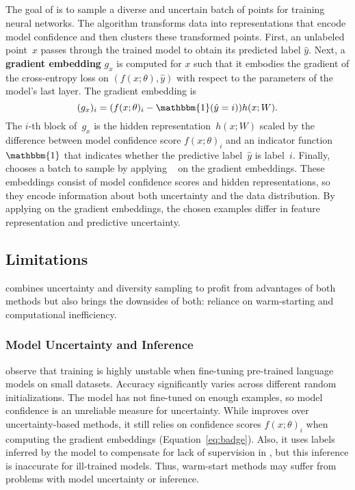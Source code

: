 \subsection{\badge}
\label{ssec:badge}
The goal of \badge{} is to sample a diverse and uncertain batch of points for
training neural networks.
The algorithm transforms data into representations that encode
model confidence and then clusters these transformed points.
First, an unlabeled point~$x$ passes through the trained model to
obtain its predicted label $\hat{y}$. Next, a \textbf{gradient embedding} $g_x$ is
computed for $x$ such that it embodies the gradient of the cross-entropy loss
on
$(f(x; \theta), \hat{y})$
with respect to the parameters of the model's last layer.
The gradient embedding is
\begin{equation}
\label{eq:badge}
(g_x)_i =  (f(x; \theta)_i- \mathbbm{1} (\hat{y} = i))h(x; W).
\end{equation}
The $i$-th block of~$g_x$ is the hidden representation~$h(x; W)$ scaled by
the difference between model confidence score $f(x; \theta)_i$ and an
indicator function
$\mathbbm{1}$ that indicates whether the predictive label~$\hat{y}$ is label~$i$.
Finally,
\badge{} chooses a batch to sample by applying \kmpp{}~\citep{arthur-2006} on
the gradient embeddings.
These embeddings consist of model confidence scores and hidden
representations, so they encode information about both uncertainty and
the data distribution.
By applying \kmpp{} on the gradient embeddings, the
 chosen examples differ in feature representation and predictive uncertainty.


\subsection{Limitations}
\badge{} combines uncertainty and diversity sampling to profit from advantages
of both methods but also brings the downsides of both:
reliance on warm-starting and computational inefficiency.


\subsubsection{Model Uncertainty and Inference}
\label{ssec:uncertainty}

\citet{dodge-2020} observe that training is highly unstable when fine-tuning
pre-trained language models on small datasets.
Accuracy significantly varies across different random initializations.
The model has not fine-tuned on
enough examples, so model confidence is an
unreliable measure for uncertainty.
While \badge{} improves over
uncertainty-based methods, it still relies on confidence scores $f(x; \theta)_i$ when
computing the gradient embeddings (Equation~\ref{eq:badge}).
Also, it uses
labels inferred by the model to compensate for lack of supervision
in \al{}, but this inference is inaccurate for ill-trained models.
Thus, warm-start methods may suffer from problems with model uncertainty or
inference.

